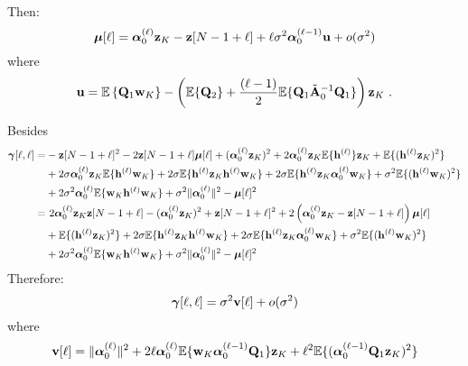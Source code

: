 Then:
\begin{equation}
\bmu[\ell] =  \balpha_0^{(\ell)}\bz_{K} - \bz[N-1+\ell] + \ell\sigma^2\balpha_0^{(\ell-1)}\bu + o(\sigma^2)
\label{eq:bias.2}
\end{equation}
where
\begin{equation}
\bu = \EE\left\{\bQ_1\bw_K\right\}-\left(\EE\{\bQ_2\} + \dfrac{(\ell-1)}{2}\EE\{\bQ_1\tilde\bA_0^{-1}\bQ_1\}\right)\bz_K \ .
\label{eq:bias.err}
\end{equation}

Besides
\begin{align*}
\boldsymbol{\gamma}[\ell,\ell] =& -{\mathbf z}[N-1+\ell]^2 -2{\mathbf z}[N-1+\ell]\boldsymbol{\mu}[\ell] +(\boldsymbol{\alpha}_0^{(\ell)}{\mathbf z}_K)^2 +2\boldsymbol{\alpha}_0^{(\ell)}{\mathbf z}_K{\mathbb E}\{{\mathbf h}^{(\ell)}\}{\mathbf z}_K+ {\mathbb E}\{({\mathbf h}^{(\ell)}{\mathbf z}_K)^2\}  \\
&+ 2\sigma\boldsymbol{\alpha}_0^{(\ell)}{\mathbf z}_K{\mathbb E}\{{\mathbf h}^{(\ell)}{\mathbf w}_K\} + 2\sigma{\mathbb E}\{{\mathbf h}^{(\ell)}{\mathbf z}_K{\mathbf h}^{(\ell)}{\mathbf w}_K\} + 2\sigma{\mathbb E}\{{\mathbf h}^{(\ell)}{\mathbf z}_K\boldsymbol{\alpha}_0^{(\ell)}{\mathbf w}_K\} + \sigma^2{\mathbb E}\{({\mathbf h}^{(\ell)}{\mathbf w}_K)^2\} \\
&+ 2\sigma^2\boldsymbol{\alpha}_0^{(\ell)}{\mathbb E}\{{\mathbf w}_K{\mathbf h}^{(\ell)}{\mathbf w}_K\} + \sigma^2\|\boldsymbol{\alpha}_0^{(\ell)}\|^2  - \boldsymbol{\mu}[\ell]^2\\
=&\ 2\boldsymbol{\alpha}_0^{(\ell)}{\mathbf z}_K{\mathbf z}[N-1+\ell] -(\boldsymbol{\alpha}_0^{(\ell)}{\mathbf z}_K)^2+{\mathbf z}[N-1+\ell]^2 +2\left(\boldsymbol{\alpha}_0^{(\ell)}{\mathbf z}_K-{\mathbf z}[N-1+\ell]\right)\boldsymbol{\mu}[\ell] \\
& +{\mathbb E}\{({\mathbf h}^{(\ell)}{\mathbf z}_K)^2\} + 2\sigma{\mathbb E}\{{\mathbf h}^{(\ell)}{\mathbf z}_K{\mathbf h}^{(\ell)}{\mathbf w}_K\} + 2\sigma{\mathbb E}\{{\mathbf h}^{(\ell)}{\mathbf z}_K\boldsymbol{\alpha}_0^{(\ell)}{\mathbf w}_K\} + \sigma^2{\mathbb E}\{({\mathbf h}^{(\ell)}{\mathbf w}_K)^2\} \\
&+ 2\sigma^2\boldsymbol{\alpha}_0^{(\ell)}{\mathbb E}\{{\mathbf w}_K{\mathbf h}^{(\ell)}{\mathbf w}_K\} + \sigma^2\|\boldsymbol{\alpha}_0^{(\ell)}\|^2 - \boldsymbol{\mu}[\ell]^2
\end{align*}
Therefore:
\begin{equation}
\bgamma[\ell,\ell] = \sigma^2\bv[\ell] + o(\sigma^2)
\label{eq:mse}
\end{equation}
where
\begin{equation}
\bv[\ell] = \|\balpha_0^{(\ell)}\|^2 +2\ell\balpha_0^{(\ell)}\EE\{\bw_K \balpha_0^{(\ell-1)}\bQ_1\}\bz_K +\ell^2\EE\{(\balpha_0^{(\ell-1)}\bQ_1\bz_K)^2\}
\label{eq:mse.err}
\end{equation}

